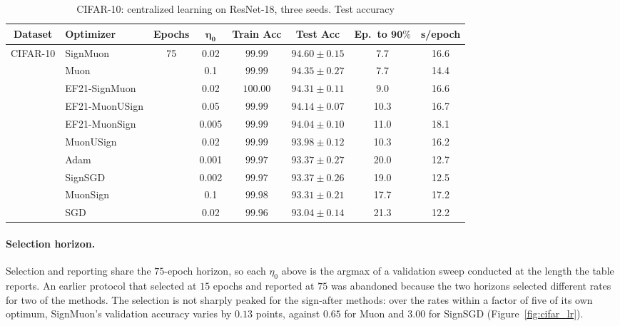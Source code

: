 \begin{table}[!t]
\centering
\small
\renewcommand{\arraystretch}{1.2}
\begin{tabular}{|c|l|c|c|c|c|c|c|}
\hline
\textbf{Dataset} & \textbf{Optimizer} & \textbf{Epochs} & $\boldsymbol{\eta_0}$ & \textbf{Train Acc} & \textbf{Test Acc} & \textbf{Ep.\ to $\mathbf{90\%}$} & \textbf{s/epoch} \\
\hline
\multirow{10}{*}{CIFAR-10}
& SignMuon & \multirow{10}{*}{75} & 0.02 & $99.99$ & $94.60 \pm 0.15$ & 7.7 & 16.6 \\
\cline{2-2} \cline{4-8}
& Muon & & 0.1 & $99.99$ & $94.35 \pm 0.27$ & 7.7 & 14.4 \\
\cline{2-2} \cline{4-8}
& EF21-SignMuon & & 0.02 & $100.00$ & $94.31 \pm 0.11$ & 9.0 & 16.6 \\
\cline{2-2} \cline{4-8}
& EF21-MuonUSign & & 0.05 & $99.99$ & $94.14 \pm 0.07$ & 10.3 & 16.7 \\
\cline{2-2} \cline{4-8}
& EF21-MuonSign & & 0.005 & $99.99$ & $94.04 \pm 0.10$ & 11.0 & 18.1 \\
\cline{2-2} \cline{4-8}
& MuonUSign & & 0.02 & $99.99$ & $93.98 \pm 0.12$ & 10.3 & 16.2 \\
\cline{2-2} \cline{4-8}
& Adam & & 0.001 & $99.97$ & $93.37 \pm 0.27$ & 20.0 & 12.7 \\
\cline{2-2} \cline{4-8}
& SignSGD & & 0.002 & $99.97$ & $93.37 \pm 0.26$ & 19.0 & 12.5 \\
\cline{2-2} \cline{4-8}
& MuonSign & & 0.1 & $99.98$ & $93.31 \pm 0.21$ & 17.7 & 17.2 \\
\cline{2-2} \cline{4-8}
& SGD & & 0.02 & $99.96$ & $93.04 \pm 0.14$ & 21.3 & 12.2 \\
\hline
\end{tabular}
\caption{CIFAR-10: centralized learning on ResNet-18,  three seeds. Test accuracy }
\label{tab:cifar_central}
\end{table}

\paragraph{Selection horizon.} Selection and reporting share the $75$-epoch horizon, so each $\eta_0$ above is the argmax of a validation sweep conducted at the length the table reports. An earlier protocol that selected at $15$ epochs and reported at $75$ was abandoned because the two horizons selected different rates for two of the methods. The selection is not sharply peaked for the sign-after methods: over the rates within a factor of five of its own optimum, SignMuon's validation accuracy varies by $0.13$ points, against $0.65$ for Muon and $3.00$ for SignSGD (Figure~\ref{fig:cifar_lr}).

